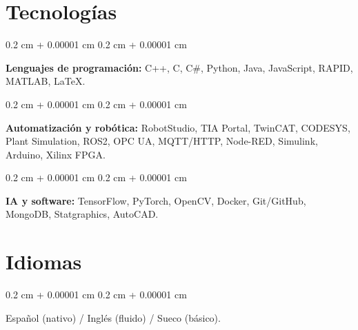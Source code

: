 \documentclass[10pt, letterpaper]{article}
\newenvironment{onecolentry}{
    \begin{adjustwidth}{
        0.2 cm + 0.00001 cm
    }{
        0.2 cm + 0.00001 cm
    }
}{
    \end{adjustwidth}
} %
\begin{document}
        \section{Tecnologías}

        \begin{onecolentry}
            \textbf{Lenguajes de programación:} C++, C, C\#, Python, Java, JavaScript, RAPID, MATLAB, LaTeX.
        \end{onecolentry}

        \vspace{0.2 cm}

        \begin{onecolentry}
            \textbf{Automatización y robótica:} RobotStudio, TIA Portal, TwinCAT, CODESYS, Plant Simulation, ROS2, OPC UA, MQTT/HTTP, Node-RED, Simulink, Arduino, Xilinx FPGA.
        \end{onecolentry}

        \vspace{0.2 cm}

        \begin{onecolentry}
            \textbf{IA y software:} TensorFlow, PyTorch, OpenCV, Docker, Git/GitHub, MongoDB, Statgraphics, AutoCAD.
        \end{onecolentry}

        \section{Idiomas}

        \begin{onecolentry}
         Español (nativo) / Inglés (fluido) / Sueco (básico).
        \end{onecolentry}
\end{document}
